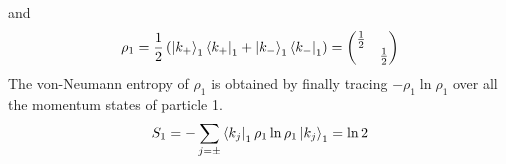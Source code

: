 \documentclass[12pt,twoside]{article}
\numberwithin{equation}{section}
\begin{document}
{and
\begin{equation}\begin{aligned}
	\rho_1 = \frac{1}{2}\left( \ket{k_+}_1\bra{k_+}_1 + \ket{k_-}_1\bra{k_-}_1 \right) = \begin{pmatrix} \frac{1}{2} & \\ &  \frac{1}{2}\end{pmatrix} 
\end{aligned}\end{equation}
The von-Neumann entropy of \(\rho_1\) is obtained by finally tracing \(-\rho_1 \ln \rho_1\) over all the momentum states of particle 1.
\begin{equation}\begin{aligned}
	S_1 = -\sum_{j=\pm}\bra{k_j}_1 \rho_1 \ln \rho_1 \ket{k_j}_1 = \ln 2
\end{aligned}\end{equation}

}
\end{document}
